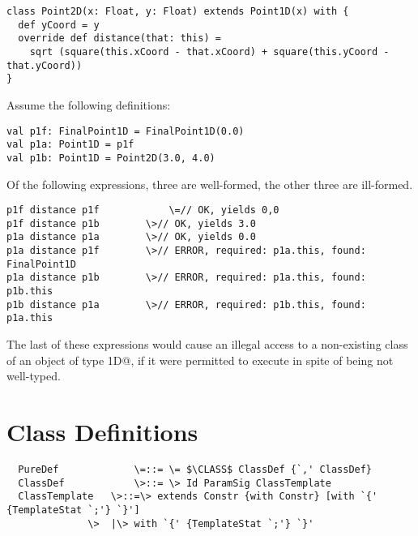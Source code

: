 \documentclass[11pt]{report}
\begin{document}
{\begin{verbatim}
class Point2D(x: Float, y: Float) extends Point1D(x) with {
  def yCoord = y
  override def distance(that: this) =
    sqrt (square(this.xCoord - that.xCoord) + square(this.yCoord - that.yCoord))
}
\end{verbatim}
Assume the following definitions:
\begin{verbatim}
val p1f: FinalPoint1D = FinalPoint1D(0.0)
val p1a: Point1D = p1f
val p1b: Point1D = Point2D(3.0, 4.0)
\end{verbatim}
Of the following expressions, three are well-formed, the other three
are ill-formed.
\begin{verbatim}
p1f distance p1f            \=// OK, yields 0,0
p1f distance p1b	    \>// OK, yields 3.0
p1a distance p1a 	    \>// OK, yields 0.0
p1a distance p1f		\>// ERROR, required: p1a.this, found: FinalPoint1D
p1a distance p1b		\>// ERROR, required: p1a.this, found: p1b.this
p1b distance p1a		\>// ERROR, required: p1b.this, found: p1a.this
\end{verbatim}
The last of these expressions would cause an illegal access to a
non-existing class \verb@yCoord@ of an object of type \verb@Point1D@,
if it were permitted to execute in spite of being not well-typed.
}

\section{Class Definitions}
\label{sec:classes}

\syntax\begin{verbatim}
  PureDef             \=::= \= $\CLASS$ ClassDef {`,' ClassDef}
  ClassDef            \>::= \> Id ParamSig ClassTemplate
  ClassTemplate   \>::=\> extends Constr {with Constr} [with `{' {TemplateStat `;'} `}']
	          \>  |\> with `{' {TemplateStat `;'} `}'
\end{verbatim}
\end{document}
